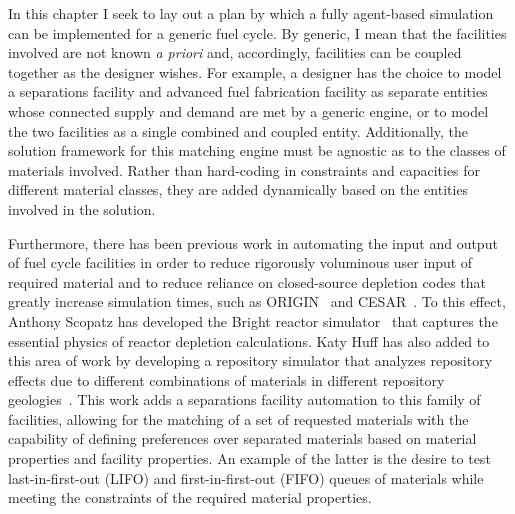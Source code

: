 In this chapter I seek to lay out a plan by which a fully agent-based simulation
can be implemented for a generic fuel cycle. By generic, I mean that the
facilities involved are not known \textit{a priori} and, accordingly,
facilities can be coupled together as the designer wishes. For example, a
designer has the choice to model a separations facility and advanced fuel
fabrication facility as separate entities whose connected supply and demand are
met by a generic engine, or to model the two facilities as a single combined and
coupled entity. Additionally, the solution framework for this matching engine
must be agnostic as to the classes of materials involved. Rather than
hard-coding in constraints and capacities for different material classes, they
are added dynamically based on the entities involved in the solution.

Furthermore, there has been previous work in automating the input and output of
fuel cycle facilities in order to reduce rigorously voluminous user input of
required material and to reduce reliance on closed-source depletion codes that
greatly increase simulation times, such as ORIGIN~\cite{bell_origen_1973} and
CESAR~\cite{vidal_cesar:_2006}. To this effect, Anthony Scopatz has developed
the Bright reactor simulator~\cite{scopatz_essential_2011} that captures the
essential physics of reactor depletion calculations. Katy Huff has also added to
this area of work by developing a repository simulator that analyzes repository
effects due to different combinations of materials in different repository
geologies~\cite{huff_integrated_2013}. This work adds a separations facility
automation to this family of facilities, allowing for the matching of a set of
requested materials with the capability of defining preferences over separated
materials based on material properties and facility properties. An example of
the latter is the desire to test last-in-first-out (LIFO) and first-in-first-out
(FIFO) queues of materials while meeting the constraints of the required
material properties.


